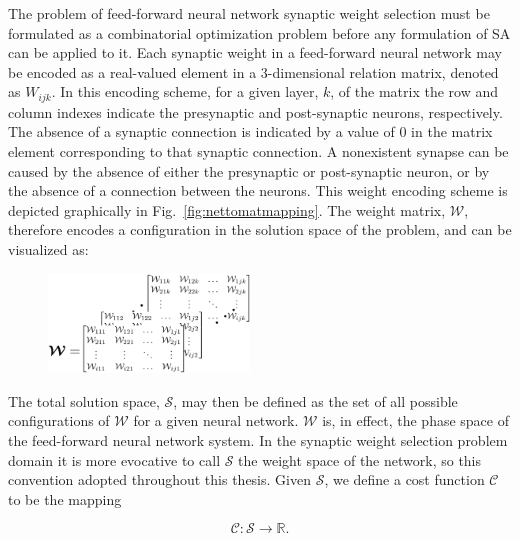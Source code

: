\documentclass[11pt]{afthesis}
\begin{document}
	 The problem of feed-forward neural network synaptic weight selection must be formulated as a combinatorial optimization problem before any formulation of SA can be applied to it. Each synaptic weight in a feed-forward neural network may be encoded as a real-valued element in a 3-dimensional relation matrix, denoted as $\mathit{W}_{ijk}$. In this encoding scheme, for a given layer, $k$, of the matrix the row and column indexes indicate the presynaptic and post-synaptic neurons, respectively. The absence of a synaptic connection is indicated by a value of $0$ in the matrix element corresponding to that synaptic connection. A nonexistent synapse can be caused by the absence of either the presynaptic or post-synaptic neuron, or by the absence of a connection between the neurons. This weight encoding scheme is depicted graphically in Fig.~\ref{fig:nettomatmapping}. The weight matrix, $\boldsymbol{\mathcal{W}}$, therefore encodes a configuration in the solution space of the problem, and can be visualized as:
	 
	 \begin{figure}[ht!]
	 	\begin{center}
	 		\includegraphics[width = 2.1in]{figures/abstract_matrix_rep.eps}
	 		\label{fig:abstract_matrix_rep}
	 	\end{center}
	 \end{figure}
	 
	 \noindent The total solution space, $\boldsymbol{\mathcal{S}}$, may then be defined as the set of all possible configurations of $\boldsymbol{\mathcal{W}}$ for a given neural network. $\boldsymbol{\mathcal{W}}$ is, in effect, the phase space of the feed-forward neural network system. In the synaptic weight selection problem domain it is more evocative to call $\boldsymbol{\mathcal{S}}$ the weight space of the network, so this convention adopted throughout this thesis. Given $\boldsymbol{\mathcal{S}}$, we define a cost function $ \mathcal{C}$ to be the mapping
	 
	 \begin{equation*} \label{eq:cost_mapping_ffnn}
	 \mathcal{C} : \boldsymbol{\mathcal{S}} \rightarrow \mathbb{R}.
	 \end{equation*}
	 
\end{document}
